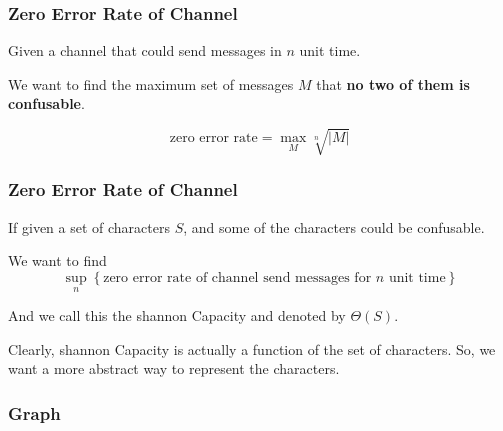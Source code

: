       \begin{frame}
            \frametitle{Zero Error Rate of Channel}
            \begin{definition}
                  Given a channel that could send messages in $n$ unit time.

                  We want to find the maximum set of messages $M$ that \textbf{no two of them is confusable}.

                  \begin{equation}
                        \text{zero error rate} = \max_{M} \sqrt[n]{|M|}
                  \end{equation}
            \end{definition}
      \end{frame}

      \begin{frame}
            \frametitle{Zero Error Rate of Channel}
            
            \begin{definition}
                  If given a set of characters $S$, and some of the characters could be confusable.

                  We want to find
                  \begin{equation}
                        \sup_{n} \left\{
                              \text{zero error rate of channel send messages for $n$ unit time}
                        \right\}
                  \end{equation}

                  And we call this the shannon Capacity and denoted by $\Theta(S)$.
            \end{definition}

            Clearly, shannon Capacity is actually a function of the set of characters. So, we want a more abstract way to represent the characters.
      \end{frame}

\subsubsection*{Graph}


